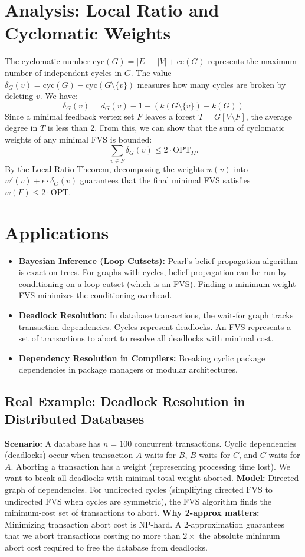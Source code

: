 \section{Analysis: Local Ratio and Cyclomatic Weights}
The cyclomatic number $\text{cyc}(G) = |E| - |V| + \text{cc}(G)$ represents the maximum number of independent cycles in $G$.
The value $\delta_G(v) = \text{cyc}(G) - \text{cyc}(G \setminus \{v\})$ measures how many cycles are broken by deleting $v$. We have:
\[
\delta_G(v) = d_G(v) - 1 - (k(G \setminus \{v\}) - k(G))
\]
Since a minimal feedback vertex set $F$ leaves a forest $T = G[V \setminus F]$, the average degree in $T$ is less than 2. From this, we can show that the sum of cyclomatic weights of any minimal FVS is bounded:
\[
\sum_{v \in F} \delta_G(v) \le 2 \cdot \text{OPT}_{IP}
\]
By the Local Ratio Theorem, decomposing the weights $w(v)$ into $w'(v) + \epsilon \cdot \delta_G(v)$ guarantees that the final minimal FVS satisfies $w(F) \le 2 \cdot \text{OPT}$.

\section{Applications}
\begin{itemize}
    \item \textbf{Bayesian Inference (Loop Cutsets):} Pearl's belief propagation algorithm is exact on trees. For graphs with cycles, belief propagation can be run by conditioning on a loop cutset (which is an FVS). Finding a minimum-weight FVS minimizes the conditioning overhead.
    \item \textbf{Deadlock Resolution:} In database transactions, the wait-for graph tracks transaction dependencies. Cycles represent deadlocks. An FVS represents a set of transactions to abort to resolve all deadlocks with minimal cost.
    \item \textbf{Dependency Resolution in Compilers:} Breaking cyclic package dependencies in package managers or modular architectures.
\end{itemize}

\subsection*{Real Example: Deadlock Resolution in Distributed Databases}
\textbf{Scenario:} A database has $n=100$ concurrent transactions. Cyclic dependencies (deadlocks) occur when transaction $A$ waits for $B$, $B$ waits for $C$, and $C$ waits for $A$. Aborting a transaction has a weight (representing processing time lost). We want to break all deadlocks with minimal total weight aborted.
\textbf{Model:} Directed graph of dependencies. For undirected cycles (simplifying directed FVS to undirected FVS when cycles are symmetric), the FVS algorithm finds the minimum-cost set of transactions to abort.
\textbf{Why 2-approx matters:} Minimizing transaction abort cost is NP-hard. A 2-approximation guarantees that we abort transactions costing no more than $2\times$ the absolute minimum abort cost required to free the database from deadlocks.

